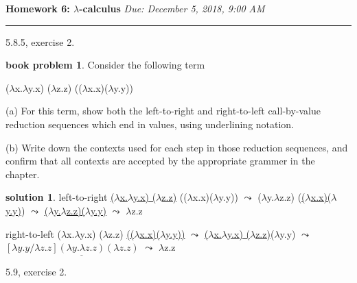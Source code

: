 \documentclass[10pt]{article}
\theoremstyle{definition}
\newtheorem{bp}{book problem}
\newtheorem{sol}{solution}
\begin{document}
\noindent
\textbf{Homework 6: $\lambda$-calculus} \hfill \emph{Due: December 5, 2018, 9:00 AM}
\hrule

\vspace{.3in}

5.8.5, exercise 2.

\begin{bp}
	Consider the following term

	($\lambda$x.$\lambda$y.x) ($\lambda$z.z) (($\lambda$x.x)($\lambda$y.y))

	(a) For this term, show both the left-to-right and right-to-left call-by-value reduction sequences which end in values, using underlining notation.

	(b) Write down the contexts used for each step in those reduction sequences, and confirm that all contexts are accepted by the appropriate grammer in the chapter.

\end{bp}

\begin{sol}
	left-to-right \newline
	\indent \indent \underline{($\lambda$x.$\lambda$y.x) ($\lambda$z.z)} (($\lambda$x.x)($\lambda$y.y)) \newline
	$\leadsto$   ($\lambda$y.$\lambda$z.z) (\underline{($\lambda$x.x)($\lambda$y.y)}) \newline
	$\leadsto$  \underline{($\lambda$y.$\lambda$z.z)($\lambda$y.y)} \newline
	$\leadsto$ $\lambda$z.z \newline

	right-to-left \newline
	\indent \indent ($\lambda$x.$\lambda$y.x) ($\lambda$z.z) \underline{(($\lambda$x.x)($\lambda$y.y))} \newline
	$\leadsto$   \underline{($\lambda$x.$\lambda$y.x) ($\lambda$z.z)}($\lambda$y.y) \newline
	$\leadsto$ $ [\lambda y.y/ \lambda z.z] \underline{(\lambda y. \lambda z.z)} ( \lambda z.z) $ \newline
	$\leadsto$ $\lambda$z.z \newline




\end{sol}

5.9, exercise 2.
\end{document}
